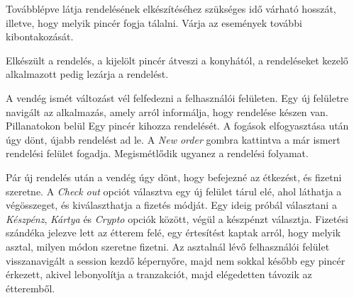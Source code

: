 
Továbblépve látja rendelésének elkészítéséhez szükséges idő várható hosszát, illetve, hogy melyik pincér fogja tálalni. Várja az események további kibontakozását.


Elkészült a rendelés, a kijelölt pincér átveszi a konyhától, a rendeléseket kezelő alkalmazott pedig lezárja a rendelést.


A vendég ismét változást vél felfedezni a felhasználói felületen. Egy új felületre navigált az alkalmazás, amely arról informálja, hogy rendelése készen van. Pillanatokon belül Egy pincér kihozza rendelését. A fogások elfogyasztása után úgy dönt, újabb rendelést ad le. A \emph{New order} gombra kattintva a már ismert rendelési felület fogadja. Megismétlődik ugyanez a rendelési folyamat. \par


Pár új rendelés után a vendég úgy dönt, hogy befejezné az étkezést, és fizetni szeretne. A \emph{Check out} opciót választva egy új felület tárul elé, ahol láthatja a végösszeget, és kiválaszthatja a fizetés módját. Egy ideig próbál választani a \emph{Készpénz}, \emph{Kártya} és \emph{Crypto} opciók között, végül a készpénzt választja. Fizetési szándéka jelezve lett az étterem felé, egy értesítést kaptak arról, hogy melyik asztal, milyen módon szeretne fizetni. Az asztalnál lévő felhasználói felület visszanavigált a session kezdő képernyőre, majd nem sokkal később egy pincér érkezett, akivel lebonyolítja a tranzakciót, majd elégedetten távozik az étteremből.

